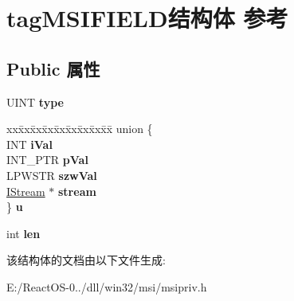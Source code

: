 \hypertarget{structtag_m_s_i_f_i_e_l_d}{}\section{tag\+M\+S\+I\+F\+I\+E\+L\+D结构体 参考}
\label{structtag_m_s_i_f_i_e_l_d}
\subsection*{Public 属性}
\begin{DoxyCompactItemize}
\item 
\mbox{\label{structtag_m_s_i_f_i_e_l_d_a689d65e4fe81f4ec1bc79fb7e47bec30}} 
U\+I\+NT {\bfseries type}
\item 
\mbox{\label{structtag_m_s_i_f_i_e_l_d_aaaebe77ba35671103666223140068725}} 
\begin{tabbing}
xx\=xx\=xx\=xx\=xx\=xx\=xx\=xx\=xx\=\kill
union \{\\
\>INT {\bfseries iVal}\\
\>INT\_PTR {\bfseries pVal}\\
\>LPWSTR {\bfseries szwVal}\\
\>\hyperlink{interface_i_stream}{IStream} $\ast$ {\bfseries stream}\\
\} {\bfseries u}\\

\end{tabbing}\item 
\mbox{\label{structtag_m_s_i_f_i_e_l_d_a1562906bb8b9488b0ba07d62cf399bcb}} 
int {\bfseries len}
\end{DoxyCompactItemize}


该结构体的文档由以下文件生成\+:\begin{DoxyCompactItemize}
\item 
E\+:/\+React\+O\+S-\/0../dll/win32/msi/msipriv.\+h\end{DoxyCompactItemize}
